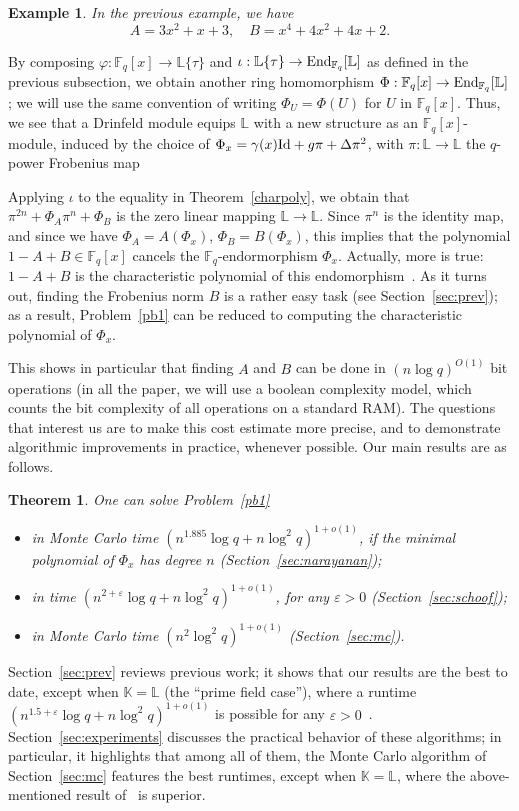 \documentclass[sigconf]{acmart}
\newtheorem{theorem}{Theorem}
\newtheorem{example}{Example}
\newcommand{\K}{\mathbb{K}}
\newcommand{\F}{\mathbb{F}}
\renewcommand{\L}{\mathbb{L}}
\newcommand{\ang}[1]{\{#1\}}
\begin{document}
\begin{example}
In the previous example, we have 
$$A = 3x^2+x+3, \quad B =x^4+4x^2+4x+2.$$
\end{example}

By composing $\varphi: \F_q[x]\to \L\ang{\tau}$ and
$\iota:\L\ang{\tau} \to {\rm End}_{\F_q}[\L]$ as defined in the
previous subsection, we obtain another ring homomorphism $\Phi:
\F_q[x]\to {\rm End}_{\F_q}[\L]$; we will use the same convention of
writing $\Phi_U=\Phi(U)$ for $U$ in $\F_q[x]$. Thus, we see that a
Drinfeld module equips $\L$ with a new structure as an
$\F_q[x]$-module, induced by the choice of $\Phi_x = \gamma(x) {\rm
  Id} + g \pi + \Delta \pi^2$, with $\pi:\L \to \L$ the $q$-power Frobenius map

Applying $\iota$ to the equality in Theorem~\ref{charpoly}, we obtain
that $\pi^{2n} + \Phi_A \pi^n + \Phi_B$ is the zero linear mapping $\L
\to \L$. Since $\pi^{n}$ is the identity map, and since we have
$\Phi_A = A(\Phi_x)$, $\Phi_B = B(\Phi_x)$, this implies that the
polynomial $1-A+B \in \F_q[x]$ cancels the $\F_q$-endormorphism
$\Phi_x$. Actually, more is true: $1-A+B$ is the characteristic
polynomial of this endomorphism~\cite[Th.~5.1]{GEKELE1991187}.  As it
turns out, finding the Frobenius norm $B$ is a rather easy task (see
Section~\ref{sec:prev}); as a result, Problem~\ref{pb1} can be reduced to
computing the characteristic polynomial of $\Phi_x$.

This shows in particular that finding $A$ and $B$ can be done in $(n
\log q)^{O(1)}$ bit operations (in all the paper, we will use a
boolean complexity model, which counts the bit complexity of all
operations on a standard RAM). The questions that interest us are to
make this cost estimate more precise, and to demonstrate algorithmic
improvements in practice, whenever possible. Our main results are as
follows.
\begin{theorem}\label{theo:main}
One can solve Problem~\ref{pb1}
\begin{itemize}
\item in Monte Carlo time $(n^{1.885} \log q + n \log^2 q)^{1+o(1)}$,
  if the minimal polynomial of $\Phi_x$ has degree $n$ (Section~\ref{sec:narayanan});
\item in time $(n^{2+\varepsilon} \log q + n \log^2 q)^{1+o(1)}$, for
  any $\varepsilon > 0$ (Section~\ref{sec:schoof});
\item in Monte Carlo time $(n^2 \log^2 q)^{1+o(1)}$ (Section~\ref{sec:mc}).
\end{itemize}
\end{theorem}
Section~\ref{sec:prev} reviews previous work; it shows that our
results are the best to date, except when $\K=\L$ (the ``prime field
case''), where a runtime $(n^{1.5+\varepsilon} \log q + n \log^2
q)^{1+o(1)}$ is possible for any $\varepsilon > 0$~\cite{eschost2017arXiv171200669D}.
Section~\ref{sec:experiments} discusses the practical behavior of
these algorithms; in particular, it highlights that among all of them,
the Monte Carlo algorithm of Section~\ref{sec:mc} features the best
runtimes, except when $\K=\L$, where the above-mentioned result of~\cite{eschost2017arXiv171200669D}
is superior.
\end{document}
